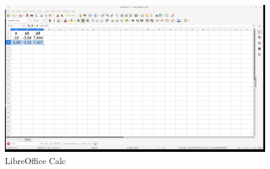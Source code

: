 \begin{figure}[h!]		
	\centering
   	\includegraphics[width=8.0in]{pictures/picture_011.png}
  	\caption{LibreOffice Calc}
   	\label{fig:LibreOfficeCalc011}
\end{figure}